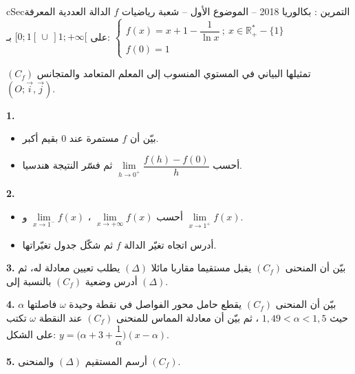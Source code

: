 \documentclass[12pt,a4paper]{article}
\newenvironment{BOX}[2]{\begin{otherlanguage}{english}\begin{arbox}{#1}{#2}}{\end{arbox}\end{otherlanguage}}
\newcounter{exo}
\newenvironment{tamrin}[1]{\stepcounter{exo}\begin{BOX}{cSec}{التمرين \theexo: #1}}{\end{BOX}}
\newcommand{\R}{\mathbb{R}}
\newenvironment{sq}{\begin{itemize}[leftmargin=2.4em,itemsep=3pt]}{\end{itemize}}
\newcommand{\qa}{\item[(أ)]}\newcommand{\qb}{\item[(ب)]}\newcommand{\qc}{\item[(جـ)]}\newcommand{\qd}{\item[(د)]}\newcommand{\qe}{\item[(هـ)]}
\newcommand{\QQ}[1]{\par\smallskip\textbf{#1.} }
\begin{document}
\begin{tamrin}{بكالوريا 2018 -- الموضوع الأول -- شعبة رياضيات}
$f$ الدالة العددية المعرفة على $[0;1[\,\cup\,]1;+\infty[$ بـ:
$\begin{cases} f(x)=x+1-\dfrac{1}{\ln x}\ ;\ x\in\R_+^{*}-\{1\}\\[4pt] f(0)=1\end{cases}$

$(C_f)$ تمثيلها البياني في المستوي المنسوب إلى المعلم المتعامد والمتجانس $(O;\vec i,\vec j)$.
\QQ{1}
\begin{sq}
\qa بيّن أن $f$ مستمرة عند $0$ بقيم أكبر.
\qb أحسب $\lim\limits_{h\to0^{+}}\dfrac{f(h)-f(0)}{h}$ ثم فسّر النتيجة هندسيا.
\end{sq}
\QQ{2}
\begin{sq}
\qa أحسب $\lim\limits_{x\to+\infty}f(x)$ ، $\lim\limits_{x\to1^{-}}f(x)$ و $\lim\limits_{x\to1^{+}}f(x)$.
\qb أدرس اتجاه تغيّر الدالة $f$ ثم شكّل جدول تغيّراتها.
\end{sq}
\QQ{3} بيّن أن المنحنى $(C_f)$ يقبل مستقيما مقاربا مائلا $(\Delta)$ يطلب تعيين معادلة له، ثم أدرس وضعية $(C_f)$ بالنسبة إلى $(\Delta)$.
\QQ{4} بيّن أن المنحنى $(C_f)$ يقطع حامل محور الفواصل في نقطة وحيدة $\omega$ فاصلتها $\alpha$ حيث $1{,}49<\alpha<1{,}5$ ، ثم بيّن أن معادلة المماس للمنحنى $(C_f)$ عند النقطة $\omega$ تكتب على الشكل: $y=\Big(\alpha+3+\dfrac1\alpha\Big)(x-\alpha)$.
\QQ{5} أرسم المستقيم $(\Delta)$ والمنحنى $(C_f)$.
\end{tamrin}
\end{document}
